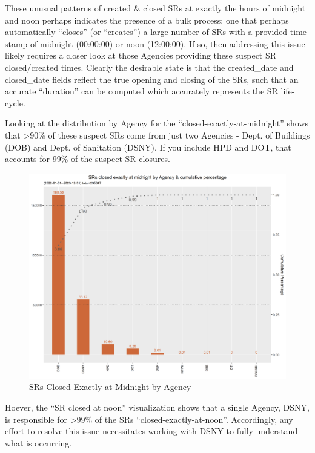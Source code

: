 \documentclass[12pt, titlepage]{article}
\begin{document}
	These unusual patterns of created \& closed SRs at exactly the hours of midnight and noon perhaps indicates
	the presence of a bulk process; one that perhaps automatically ``closes'' (or ``creates'') a large number of SRs with a provided
	time-stamp of midnight (00:00:00) or noon (12:00:00). If so, then addressing this issue likely requires a closer look at those 
	Agencies providing these suspect SR closed/created times. Clearly the desirable state is that the created\_date and closed\_date fields
	reflect the true opening and closing of the SRs, such that an accurate ``duration'' can be computed which accurately
	represents the SR life-cycle. 

	Looking at the distribution by Agency for the ``closed-exactly-at-midnight'' shows that \textgreater{}90\% of these suspect SRs come from just two Agencies - Dept. of 
	Buildings (DOB) and Dept. of Sanitation (DSNY). If you include HPD and DOT, that accounts for 99\% of the suspect SR closures.

	\begin{figure}[H]
		 \centering
		 \includegraphics[scale = 0.65]{closed_at_midnight_chart.png}
		 \caption{SRs Closed Exactly at Midnight by Agency}
		 \label{fig:midnight-closed}
	\end{figure}	

	
	Hoever, the ``SR closed at noon'' visualization shows that  a single Agency, DSNY,
	is responsible for \textgreater{}99\% of the SRs ``closed-exactly-at-noon''. Accordingly, any effort to resolve this issue
	necessitates working with DSNY to fully understand what is occurring. 
	
\end{document}
